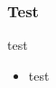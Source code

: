 \begin{frame}
\frametitle{Test}
\begin{block}{test}
\begin{itemize}
\item test
\end{itemize}
\end{block}
\end{frame}